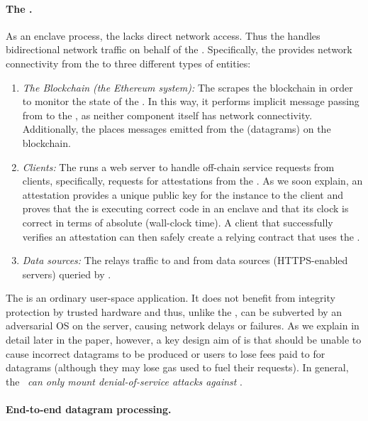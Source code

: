 \paragraph{The \medname.} As an enclave process, the \encname lacks direct network access. Thus the \medname handles bidirectional network traffic on behalf of the \encname. Specifically, the \medname provides network connectivity from the \encname to three different types of entities: 

\begin{enumerate}
\item {\em The Blockchain (the Ethereum system):}  The \medname scrapes the blockchain in order to monitor the state of the \tcontract  \tcont. In this way, it performs implicit message passing from \tcont to the \encname, as neither component itself has network connectivity. Additionally, the \medname places messages emitted from the \encname (datagrams) on the blockchain.
\item {\em Clients:} The \medname runs a web server to handle off-chain service requests from clients, specifically, requests for attestations from the \encname. As we soon explain, an attestation provides a unique public key for the \encname instance to the  client and proves that the \encname is executing correct code in an enclave and that its clock is correct in terms of absolute (wall-clock time). A client that successfully verifies an attestation can then safely create a relying contract \reqcont that uses the \tc.
\item {\em Data sources:} The \medname relays traffic to and from data sources (HTTPS-enabled servers) queried by \encname. 
\end{enumerate}

The \medname is an ordinary user-space application. It does not benefit from integrity protection by trusted hardware and thus, unlike the \encname, can be subverted by an adversarial OS on the \tc server, causing network delays or failures. As we explain in detail later in the paper, however, a key design aim of \tc is that \medname should be unable to cause incorrect datagrams to be produced or users to lose fees paid to \tc for datagrams (although they may lose gas used to fuel their requests). In general, the \medname~{\em can only mount denial-of-service attacks against \tc}. 

\paragraph{End-to-end datagram processing.}

